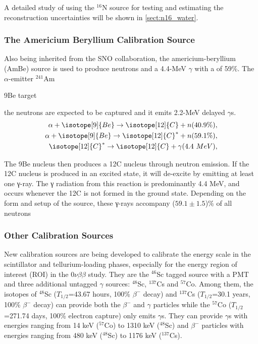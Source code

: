 
A detailed study of using the $^{16}$N source for testing and estimating the reconstruction uncertainties will be shown in \ref{sect:n16_water}.

\subsubsection{The Americium Beryllium Calibration Source}\label{sect:AmBesource}
Also being inherited from the SNO collaboration, the americium-beryllium (AmBe) source 
is used to produce neutrons and a 4.4-MeV $\gamma$ with a of 59\%. The $\alpha$-emitter $^{241}$Am  


  9Be target



the neutrons are expected to be captured and it emits 2.2-MeV delayed $\gamma$s. 
\begin{equation}
\begin{split}
\alpha + \isotope[9]{Be} \to \isotope[12]{C} + n (40.9\%),\\
\alpha + \isotope[9]{Be} \to \isotope[12]{C}^* + n (59.1\%),\\
\isotope[12]{C}^* \to \isotope[12]{C} + \gamma (4.4~MeV),\\
\end{split}
\end{equation}



The 9Be nucleus then produces a 12C nucleus through neutron emission. If the 12C nucleus is produced
in an excited state, it will de-excite by emitting at least one γ-ray. The γ radiation from this reaction is
predominantly 4.4 MeV, and occurs whenever the 12C is not formed in the ground state. Depending on the
form and setup of the source, these γ-rays accompany ($59.1\pm 1.5$)\% of all neutrons 


\subsubsection{Other Calibration Sources}

New calibration sources are being developed to calibrate the energy scale in the scintillator and tellurium-loading phases, especially for the energy region of interest (ROI) in the $0\nu\beta\beta$ study. They are the $^{46}$Sc tagged source with a PMT and three additional untagged $\gamma$ sources: $^{48}$Sc, $^{137}$Cs and $^{57}$Co\cite{snop_jinst}. Among them, the isotopes of $^{48}$Sc ($T_{1/2}$=43.67 hours, 100\% $\beta^-$ decay) and $^{137}$Cs ($T_{1/2}$=30.1 years, 100\% $\beta^-$ decay) can provide both the $\beta^-$ and $\gamma$ particles while the $^{57}$Co  ($T_{1/2}$=271.74 days, 100\% electron capture) only emits $\gamma$s. They can provide $\gamma$s with energies ranging from 14 keV ($^{57}$Co) to 1310 keV ($^{48}$Sc) and $\beta^-$ particles with energies ranging from 480 keV ($^{48}$Sc) to 1176 keV ($^{137}$Cs)\cite{nndc}.

